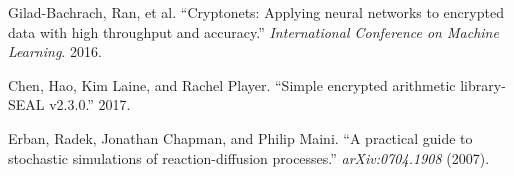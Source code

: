 \documentclass[12pt]{article}
\begin{document}

\begin{thebibliography}{99}

Gilad-Bachrach, Ran, et al. ``Cryptonets: Applying neural networks to encrypted data with high throughput and accuracy.'' \textit{International Conference on Machine Learning}. 2016.

Chen, Hao, Kim Laine, and Rachel Player. ``Simple encrypted arithmetic library-SEAL v2.3.0.'' 2017.

Erban, Radek, Jonathan Chapman, and Philip Maini. ``A practical guide to stochastic simulations of reaction-diffusion processes.'' \textit{arXiv:0704.1908} (2007).

\end{thebibliography}
\end{document}
